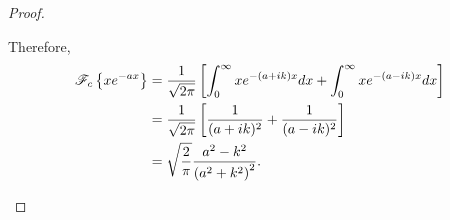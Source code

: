 \begin{proof}
\begin{enumerate}
      Therefore,
      \begin{align*}
        \mathscr{F}_c\left\{ {xe^{-ax}} \right\} &= \frac{1}{\sqrt{2\pi}}\left[\int_0^\infty x e^{-(a+ik)x}dx + \int_0^\infty x e^{-(a-ik)x}dx\right] \\
        &= \frac{1}{\sqrt{2\pi}}\left[\frac{1}{(a+ik)^2} + \frac{1}{(a-ik)^2}\right] \\
        &= \sqrt{\frac{2}{\pi}}\frac{a^2 - k^2}{\left(a^2 + k^2\right)^2}.
      \end{align*}
  \end{enumerate}
\end{proof}
\newpage

